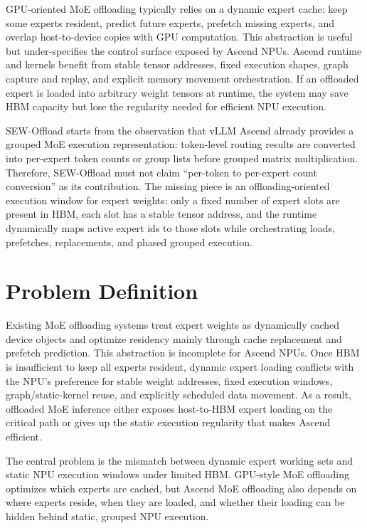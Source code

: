 \documentclass[10pt]{article}
\begin{document}
GPU-oriented MoE offloading typically relies on a dynamic expert cache: keep
some experts resident, predict future experts, prefetch missing experts, and
overlap host-to-device copies with GPU computation. This abstraction is useful
but under-specifies the control surface exposed by Ascend NPUs. Ascend runtime
and kernels benefit from stable tensor addresses, fixed execution shapes, graph
capture and replay, and explicit memory movement orchestration. If an offloaded
expert is loaded into arbitrary weight tensors at runtime, the system may save
HBM capacity but lose the regularity needed for efficient NPU execution.

SEW-Offload starts from the observation that vLLM Ascend already provides a
grouped MoE execution representation: token-level routing results are converted
into per-expert token counts or group lists before grouped matrix
multiplication. Therefore, SEW-Offload must not claim ``per-token to
per-expert count conversion'' as its contribution. The missing piece is an
offloading-oriented execution window for expert weights: only a fixed number of
expert slots are present in HBM, each slot has a stable tensor address, and the
runtime dynamically maps active expert ids to those slots while orchestrating
loads, prefetches, replacements, and phased grouped execution.

\section{Problem Definition}

Existing MoE offloading systems treat expert weights as dynamically cached
device objects and optimize residency mainly through cache replacement and
prefetch prediction. This abstraction is incomplete for Ascend NPUs. Once HBM
is insufficient to keep all experts resident, dynamic expert loading conflicts
with the NPU's preference for stable weight addresses, fixed execution windows,
graph/static-kernel reuse, and explicitly scheduled data movement. As a result,
offloaded MoE inference either exposes host-to-HBM expert loading on the
critical path or gives up the static execution regularity that makes Ascend
efficient.

The central problem is the mismatch between dynamic expert working sets and
static NPU execution windows under limited HBM. GPU-style MoE offloading
optimizes which experts are cached, but Ascend MoE offloading also depends on
where experts reside, when they are loaded, and whether their loading can be
hidden behind static, grouped NPU execution.
\end{document}
